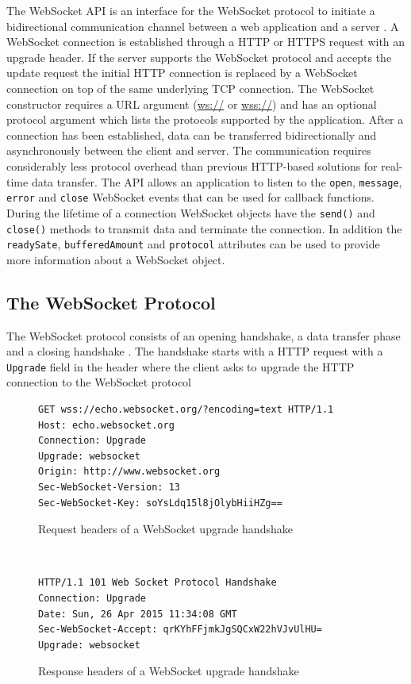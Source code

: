The WebSocket API is an interface for the WebSocket protocol to initiate a bidirectional communication channel between a web application and a server \cite{hickson2011websocket}. A WebSocket connection is established through a HTTP or HTTPS request with an upgrade header. If the server supports the WebSocket protocol and accepts the update request the initial HTTP connection is replaced by a WebSocket connection on top of the same underlying TCP connection. The WebSocket constructor requires a URL argument (\url{ws://} or \url{wss://}) and has an optional protocol argument which lists the protocols supported by the application. After a connection has been established, data can be transferred bidirectionally and asynchronously between the client and server. The communication requires considerably less protocol overhead than previous HTTP-based solutions for real-time data transfer. The API allows an application to listen to the \texttt{open}, \texttt{message}, \texttt{error} and \texttt{close} WebSocket events that can be used for callback functions. During the lifetime of a connection WebSocket objects have the \texttt{send()} and \texttt{close()} methods to transmit data and terminate the connection. In addition the \texttt{readySate}, \texttt{bufferedAmount} and \texttt{protocol} attributes can be used to provide more information about a WebSocket object. 

\subsection{The WebSocket Protocol}

The WebSocket protocol consists of an opening handshake, a data transfer phase and a closing handshake \cite{fette2011websocket}. The handshake starts with a HTTP request with a \texttt{Upgrade} field in the header where the client asks to upgrade the HTTP connection to the WebSocket protocol
\\
\begin{figure}[h!]
\begin{Verbatim}[fontsize=\small]
GET wss://echo.websocket.org/?encoding=text HTTP/1.1
Host: echo.websocket.org
Connection: Upgrade
Upgrade: websocket
Origin: http://www.websocket.org
Sec-WebSocket-Version: 13
Sec-WebSocket-Key: soYsLdq15l8jOlybHiiHZg==
\end{Verbatim}
\caption{Request headers of a WebSocket upgrade handshake}
\label{request-headers}
\end{figure}
\ \\
\begin{figure}[h!]
\begin{Verbatim}[fontsize=\small]
HTTP/1.1 101 Web Socket Protocol Handshake
Connection: Upgrade
Date: Sun, 26 Apr 2015 11:34:08 GMT
Sec-WebSocket-Accept: qrKYhFFjmkJgSQCxW22hVJvUlHU=
Upgrade: websocket
\end{Verbatim}
\caption{Response headers of a WebSocket upgrade handshake}
\label{response-headers}
\end{figure}

